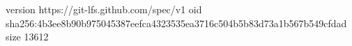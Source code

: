 version https://git-lfs.github.com/spec/v1
oid sha256:4b3ee8b90b975045387eefca4323535ea3716c504b5b83d73a1b567b549cfdad
size 13612
